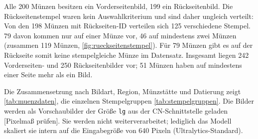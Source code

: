 Alle 200 Münzen besitzen ein Vorderseitenbild, 199 ein Rückseitenbild. Die Rückseitenstempel waren kein Auswahlkriterium und sind daher ungleich verteilt: Von den 198 Münzen mit Rückseiten-ID verteilen sich 125 verschiedene Stempel. 79 davon kommen nur auf einer Münze vor, 46 auf mindestens zwei Münzen (zusammen 119 Münzen, \cref{fig:rueckseitenstempel}). Für 79 Münzen gibt es auf der Rückseite somit keine stempelgleiche Münze im Datensatz. Insgesamt liegen 242 Vorderseiten- und 250 Rückseitenbilder vor; 51 Münzen haben auf mindestens einer Seite mehr als ein Bild. 



\noindent Die Zusammensetzung nach Bildart, Region, Münzstätte und Datierung zeigt \cref{tab:muenzdaten}, die einzelnen Stempelgruppen \cref{tab:stempelgruppen}.
Die Bilder werden als Vorschaubilder der Größe \texttt{lg} aus der CN-Schnittstelle geladen [Pixelmaß prüfen]. Sie werden nicht weiterverarbeitet; lediglich das Modell skaliert sie intern auf die Eingabegröße von 640 Pixeln (Ultralytics-Standard).

